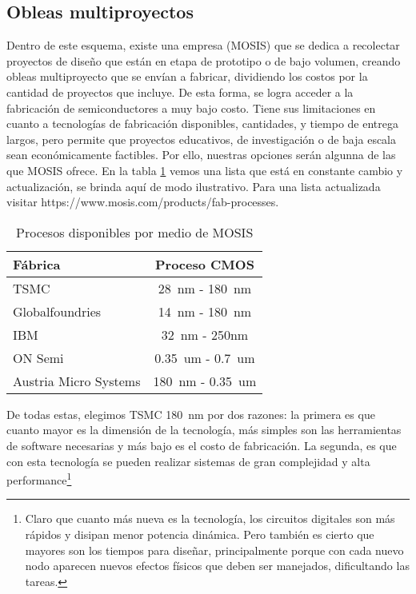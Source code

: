 \subsection{Obleas multiproyectos}
Dentro de este esquema, existe una empresa (MOSIS) que se dedica a recolectar proyectos de diseño que están en etapa de prototipo o de bajo volumen, creando obleas multiproyecto que se envían a fabricar, dividiendo los costos por la cantidad de proyectos que incluye. De esta forma, se logra acceder a la fabricación de semiconductores a muy bajo costo. Tiene sus limitaciones en cuanto a tecnologías de fabricación disponibles, cantidades, y tiempo de entrega largos, pero permite que proyectos educativos, de investigación o de baja escala sean económicamente factibles.
Por ello, nuestras opciones serán algunna de las que MOSIS ofrece. En la tabla \ref{cuadro:procesosDisponibles} vemos una lista que está en constante cambio y actualización, se brinda aquí de modo ilustrativo. Para una lista actualizada visitar https://www.mosis.com/products/fab-processes.

\begin{table}[h]
\centering
\begin{tabular}{@{}lc@{}}
\toprule
Fábrica             & Proceso CMOS \\ \midrule
TSMC                & 28~nm - 180~nm             \\
Globalfoundries     & 14~nm - 180~nm             \\
IBM                 & 32~nm -  250nm            \\
ON Semi             & 0.35~um - 0.7~um           \\
Austria Micro Systems & 180~nm - 0.35~um           \\ \bottomrule
\end{tabular}
\caption{Procesos disponibles por medio de MOSIS}
\label{cuadro:procesosDisponibles}
\end{table}

De todas estas, elegimos TSMC 180~nm por dos razones: la primera es que cuanto mayor es la dimensión de la tecnología, más simples son las herramientas de software necesarias y más bajo es el costo de fabricación. La segunda, es que con esta tecnología se pueden realizar sistemas de gran complejidad y alta performance\footnote{Claro que cuanto más nueva es la tecnología, los circuitos digitales son más rápidos y disipan menor potencia dinámica. Pero también es cierto que mayores son los tiempos para diseñar, principalmente porque con cada nuevo nodo aparecen nuevos efectos físicos que deben ser manejados, dificultando las tareas.
}

